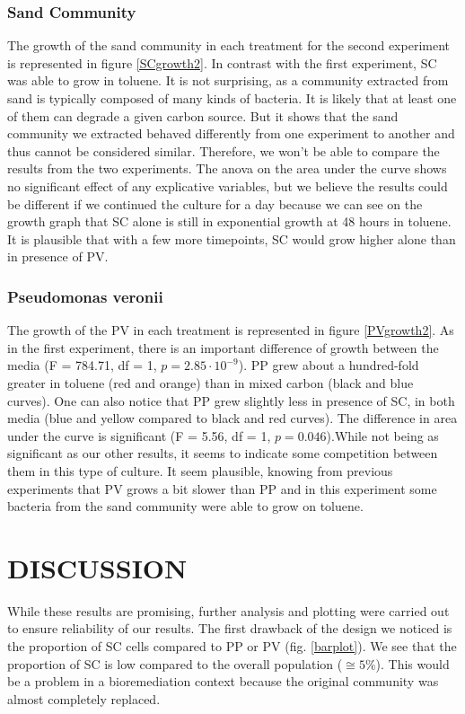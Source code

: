 \documentclass[a4paper, 10pt, conference]{ieeeconf}   %
\begin{document}
\subsubsection{Sand Community}
The growth of the sand community in each treatment for the second experiment is represented in figure \ref{SCgrowth2}.
In contrast with the first experiment, SC was able to grow in toluene. It is not surprising, as a community extracted from sand is typically composed of many kinds of bacteria. It is likely that at least one of them can degrade a given carbon source. But it shows that the sand community we extracted behaved differently from one experiment to another and thus cannot be considered similar. Therefore, we won't be able to compare the results from the two experiments. 
The anova on the area under the curve shows no significant effect of any explicative variables, but we believe the results could be different if we continued the culture for a day because we can see on the growth graph that SC alone is still in exponential growth at 48 hours in toluene. It is plausible that with a few more timepoints, SC would grow higher alone than in presence of PV.\newline

\subsubsection{Pseudomonas veronii}
The growth of the PV in each treatment is represented in figure \ref{PVgrowth2}.
As in the first experiment, there is an important difference of growth between the media (F = 784.71, df = 1, $p = 2.85 \cdot 10^{-9}$). PP grew about a hundred-fold greater in toluene (red and orange) than in mixed carbon (black and blue curves).
One can also notice that PP grew slightly less in presence of SC, in both media (blue and yellow compared to black and red curves). The difference in area under the curve is significant (F = 5.56, df = 1, $p = 0.046$).While not being as significant as our other results, it seems to indicate some competition between them in this type of culture. It seem plausible, knowing from previous experiments that PV grows a bit slower than PP and in this experiment some bacteria from the sand community were able to grow on toluene.
\newline

\section{DISCUSSION}
While these results are promising, further analysis and plotting were carried out to ensure reliability of our results. 
The first drawback of the design we noticed is the proportion of SC cells compared to PP or PV  (fig. \ref{barplot}). We see that the proportion of SC is low compared to the overall population ($\cong 5\%$). This would be a problem in a bioremediation context because the original community was almost completely replaced.
\end{document}
